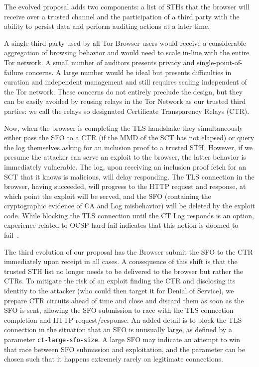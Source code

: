 The evolved proposal adds two components: a list of STHs that the browser will
receive over a trusted channel and the participation of a third party with the
ability to persist data and perform auditing actions at a later time.

A single third party used by all Tor Browser users would receive a considerable
aggregation of browsing behavior and would need to scale in-line with the entire
Tor network. A small number of auditors presents privacy and
single-point-of-failure concerns. A large number would be ideal but presents
difficulties in curation and independent management and still requires scaling
independent of the Tor network. These concerns do not entirely preclude the
design, but they can be easily avoided by reusing relays in the Tor Network as
our trusted third parties: we call the relays so designated Certificate
Transparency Relays (CTR).

Now, when the browser is completing the TLS handshake they simultaneously either
pass the SFO to a CTR (if the MMD of the SCT has not elapsed) or query the log
themselves asking for an inclusion proof to a trusted STH\@.  However, if we
presume the attacker can serve an exploit to the browser, the latter behavior is
immediately vulnerable. The log, upon receiving an inclusion proof fetch for an
SCT that it knows is malicious, will delay responding. The TLS connection in the
browser, having succeeded, will progress to the HTTP request and response, at
which point the exploit will be served, and the SFO (containing the
cryptographic evidence of CA and Log misbehavior) will be deleted by the exploit
code. While blocking the TLS connection until the CT Log responds is an option,
experience related to OCSP hard-fail indicates that this notion is doomed to
fail~\cite{no-hard-fail}.

The third evolution of our proposal has the Browser submit the SFO to the CTR
immediately upon receipt in all cases. A consequence of this shift is that the
trusted STH list no longer needs to be delivered to the browser but rather the
CTRs. To mitigate the risk of an exploit finding the CTR and disclosing its
identity to the attacker (who could then target it for Denial of Service), we
prepare CTR circuits ahead of time and close and discard them as soon as the SFO
is sent, allowing the SFO submission to race with the TLS connection completion
and HTTP request/response.  An added detail is to block the TLS connection in
the situation that an SFO is unusually large, as defined by a parameter
\texttt{ct-large-sfo-size}. A large SFO may indicate an attempt to win that race
between SFO submission and exploitation, and the parameter can be chosen such
that it happens extremely rarely on legitimate connections.

